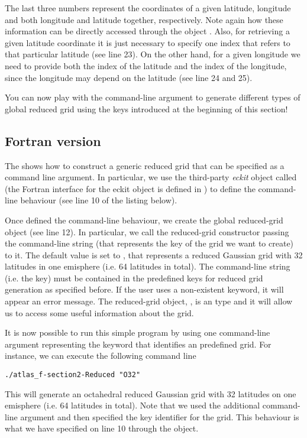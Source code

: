 The last three numbers represent the coordinates of a given 
latitude, longitude and both longitude and latitude together, 
respectively. Note again how these information can be directly 
accessed through the object . 
Also, for retrieving a given latitude coordinate it is just 
necessary to specify one index that refers to that particular 
latitude (see line 23). On the other hand, for a given longitude 
we need to provide both the index of the latitude and the index 
of the longitude, since the longitude may depend on the latitude 
(see line 24 and 25).

You can now play with the command-line argument to generate 
different types of global reduced grid using the keys introduced 
at the beginning of this section!

\subsection{Fortran version}
The  shows how to construct a generic 
reduced grid that can be specified as a command line 
argument. In particular, we use the third-party \textit{eckit} 
object called  (the Fortran interface 
for the eckit  object is defined in \Atlas) 
to define the command-line behaviour (see line 10 of the 
listing below). 

%

%

Once defined the command-line behaviour, we create the global 
reduced-grid object (see line 12). In particular, we call 
the reduced-grid constructor passing the command-line string 
(that represents the key of the grid we want to create) to 
it. The default value is set to , that represents 
a reduced Gaussian grid with 32 latitudes in one emisphere 
(i.e. 64 latitudes in total).  
The command-line string (i.e. the key) must be contained 
in the predefined keys for reduced grid generation as specified 
before. If the user uses a non-existent keyword, it will 
appear an error message.
The reduced-grid object, , is 
an  type and it will allow 
us to access some useful information about the grid.  

It is now possible to run this simple program by using 
one command-line argument representing the keyword that 
identifies an \Atlas predefined grid. For instance, we 
can execute the following command line 
%
\begin{lstlisting}[style=BashStyle]
./atlas_f-section2-Reduced "O32"
\end{lstlisting}
% 
This will generate an octahedral reduced Gaussian grid 
with 32 latitudes on one emisphere (i.e. 64 latitudes 
in total).
Note that we used the additional command-line argument 
 and then specified the key identifier 
for the grid. This behaviour is what we have specified 
on line 10 through the  object.

